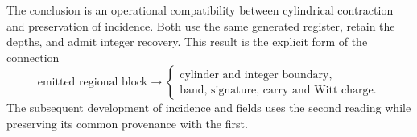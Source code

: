 The conclusion is an operational compatibility between cylindrical
contraction and preservation of incidence. Both use the same generated
register, retain the depths, and admit integer recovery. This result
is the explicit form of the connection
\[
 \text{emitted regional block}
 \longrightarrow
 \begin{cases}
 \text{cylinder and integer boundary},\\
 \text{band, signature, carry and Witt charge}.
 \end{cases}
\]
The subsequent development of incidence and fields uses the second
reading while preserving its common provenance with the first.

